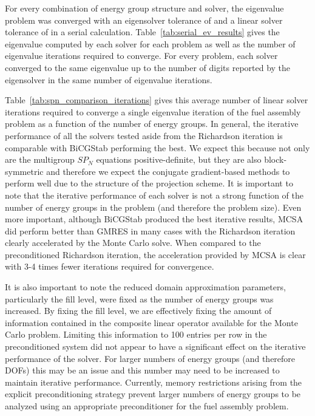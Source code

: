 \documentclass[letterpaper,11pt]{article}
\begin{document}
For every combination of energy group structure and solver, the
eigenvalue problem was converged with an eigensolver tolerance of
 and a linear solver tolerance of  in a serial
calculation. Table~\ref{tab:serial_ev_results} gives the eigenvalue
computed by each solver for each problem as well as the number of
eigenvalue iterations required to converge. For every problem, each
solver converged to the same eigenvalue up to the number of digits
reported by the eigensolver in the same number of eigenvalue
iterations.

Table~\ref{tab:spn_comparison_iterations} gives this average number of
linear solver iterations required to converge a single eigenvalue
iteration of the fuel assembly problem as a function of the number of
energy groups. In general, the iterative performance of all the
solvers tested aside from the Richardson iteration is comparable with
BiCGStab performing the best. We expect this because not only are the
multigroup $SP_N$ equations positive-definite, but they are also
block-symmetric and therefore we expect the conjugate gradient-based
methods to perform well due to the structure of the projection
scheme. It is important to note that the iterative performance of each
solver is not a strong function of the number of energy groups in the
problem (and therefore the problem size). Even more important,
although BiCGStab produced the best iterative results, MCSA did
perform better than GMRES in many cases with the Richardson iteration
clearly accelerated by the Monte Carlo solve. When compared to the
preconditioned Richardson iteration, the acceleration provided by MCSA
is clear with 3-4 times fewer iterations required for convergence.

It is also important to note the reduced domain approximation
parameters, particularly the fill level, were fixed as the number of
energy groups was increased. By fixing the fill level, we are
effectively fixing the amount of information contained in the
composite linear operator available for the Monte Carlo
problem. Limiting this information to 100 entries per row in the
preconditioned system did not appear to have a significant effect on
the iterative performance of the solver. For larger numbers of energy
groups (and therefore DOFs) this may be an issue and this number may
need to be increased to maintain iterative performance. Currently,
memory restrictions arising from the explicit preconditioning strategy
prevent larger numbers of energy groups to be analyzed using an
appropriate preconditioner for the fuel assembly problem.
\end{document}
